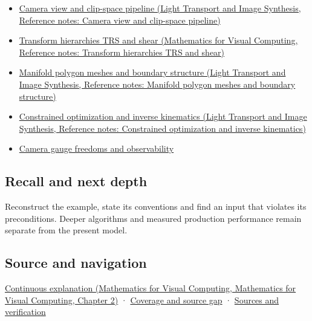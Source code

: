 \begin{itemize}
\item
  \href{../04-Light-Transport-and-Image-Synthesis/main.pdf\#nameddest=appendix-1c07d64f5e70}{Camera view and clip-space pipeline (Light Transport and Image Synthesis, Reference notes: Camera view and clip-space pipeline)}
\item
  \href{../02-Mathematics-for-Visual-Computing/main.pdf\#nameddest=appendix-292c061cd47c}{Transform hierarchies TRS and shear (Mathematics for Visual Computing, Reference notes: Transform hierarchies TRS and shear)}
\item
  \href{../04-Light-Transport-and-Image-Synthesis/main.pdf\#nameddest=appendix-fab348609369}{Manifold polygon meshes and boundary structure (Light Transport and Image Synthesis, Reference notes: Manifold polygon meshes and boundary structure)}
\item
  \href{../04-Light-Transport-and-Image-Synthesis/main.pdf\#nameddest=appendix-29f4bea4c2bb}{Constrained optimization and inverse kinematics (Light Transport and Image Synthesis, Reference notes: Constrained optimization and inverse kinematics)}
\item
  \hyperref[appendix-113f0267e5f4]{Camera gauge freedoms and observability}
\end{itemize}

\subsection{Recall and next depth}\label{appendix-1bae9457dbc3-recall-and-next-depth}

Reconstruct the example, state its conventions and find an input that violates its preconditions. Deeper algorithms and measured production performance remain separate from the present model.

\subsection{Source and navigation}\label{appendix-1bae9457dbc3-source-and-navigation}

\href{../02-Mathematics-for-Visual-Computing/main.pdf\#nameddest=01-foundations-i-ch018-keep-the-promises-visible-while-moving-between-representations}{Continuous explanation (Mathematics for Visual Computing, Mathematics for Visual Computing, Chapter 2)} · \hyperref[appendix-fd090d982a15-phase-7---parts-601-700]{Coverage and source gap} · \hyperref[appendix-a103e7846d21-phase-7---source-analysis-and-verification]{Sources and verification}

